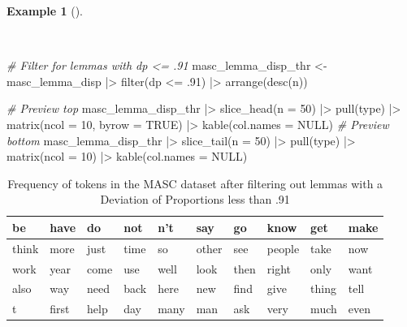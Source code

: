 \documentclass[
  letterpaper,
  DIV=11,
  numbers=noendperiod]{scrreport}
\newenvironment{Shaded}{\begin{snugshade}}{\end{snugshade}}
\newcommand{\AttributeTok}[1]{\textcolor[rgb]{0.00,0.00,0.00}{#1}}
\newcommand{\CommentTok}[1]{\textcolor[rgb]{0.00,0.00,0.00}{\textit{#1}}}
\newcommand{\ConstantTok}[1]{\textcolor[rgb]{0.00,0.00,0.00}{#1}}
\newcommand{\DecValTok}[1]{\textcolor[rgb]{0.00,0.00,0.00}{#1}}
\newcommand{\FunctionTok}[1]{\textcolor[rgb]{0.00,0.00,0.00}{#1}}
\newcommand{\NormalTok}[1]{\textcolor[rgb]{0.00,0.00,0.00}{#1}}
\newcommand{\OtherTok}[1]{\textcolor[rgb]{0.00,0.00,0.00}{#1}}
\newcommand{\SpecialCharTok}[1]{\textcolor[rgb]{0.00,0.00,0.00}{#1}}
\theoremstyle{definition}
\newtheorem{example}{Example}[chapter]
\theoremstyle{remark}
\begin{document}
\begin{example}[]\protect\hypertarget{exm-eda-masc-dp-filter}{}\label{exm-eda-masc-dp-filter}

~

\begin{Shaded}
\begin{Highlighting}[]
\CommentTok{\# Filter for lemmas with dp \textless{}= .91}
\NormalTok{masc\_lemma\_disp\_thr }\OtherTok{\textless{}{-}} 
\NormalTok{  masc\_lemma\_disp }\SpecialCharTok{|\textgreater{}} 
  \FunctionTok{filter}\NormalTok{(dp }\SpecialCharTok{\textless{}=}\NormalTok{ .}\DecValTok{91}\NormalTok{) }\SpecialCharTok{|\textgreater{}} 
  \FunctionTok{arrange}\NormalTok{(}\FunctionTok{desc}\NormalTok{(n))}

\CommentTok{\# Preview top}
\NormalTok{masc\_lemma\_disp\_thr }\SpecialCharTok{|\textgreater{}} 
  \FunctionTok{slice\_head}\NormalTok{(}\AttributeTok{n =} \DecValTok{50}\NormalTok{) }\SpecialCharTok{|\textgreater{}} 
  \FunctionTok{pull}\NormalTok{(type) }\SpecialCharTok{|\textgreater{}}
  \FunctionTok{matrix}\NormalTok{(}\AttributeTok{ncol =} \DecValTok{10}\NormalTok{, }\AttributeTok{byrow =} \ConstantTok{TRUE}\NormalTok{) }\SpecialCharTok{|\textgreater{}} 
  \FunctionTok{kable}\NormalTok{(}\AttributeTok{col.names =} \ConstantTok{NULL}\NormalTok{)}
\CommentTok{\# Preview bottom}
\NormalTok{masc\_lemma\_disp\_thr }\SpecialCharTok{|\textgreater{}}
  \FunctionTok{slice\_tail}\NormalTok{(}\AttributeTok{n =} \DecValTok{50}\NormalTok{) }\SpecialCharTok{|\textgreater{}} 
  \FunctionTok{pull}\NormalTok{(type) }\SpecialCharTok{|\textgreater{}}
  \FunctionTok{matrix}\NormalTok{(}\AttributeTok{ncol =} \DecValTok{10}\NormalTok{) }\SpecialCharTok{|\textgreater{}} 
  \FunctionTok{kable}\NormalTok{(}\AttributeTok{col.names =} \ConstantTok{NULL}\NormalTok{)}
\end{Highlighting}
\end{Shaded}

\begin{table}

\caption{\label{tbl-eda-masc-dp-filter}Frequency of tokens in the MASC
dataset after filtering out lemmas with a Deviation of Proportions less
than .91}\begin{minipage}[t]{\linewidth}

{\centering 

\hypertarget{tbl-eda-masc-dp-filter-1}{}
\tabularnewline

\centering
\begin{tabular}{l|l|l|l|l|l|l|l|l|l}
\hline
be & have & do & not & n't & say & go & know & get & make\\
\hline
think & more & just & time & so & other & see & people & take & now\\
\hline
work & year & come & use & well & look & then & right & only & want\\
\hline
also & way & need & back & here & new & find & give & thing & tell\\
\hline
t & first & help & day & many & man & ask & very & much & even\\
\hline
\end{tabular}

}
\end{minipage}
\end{table}
\end{example}
\end{document}
